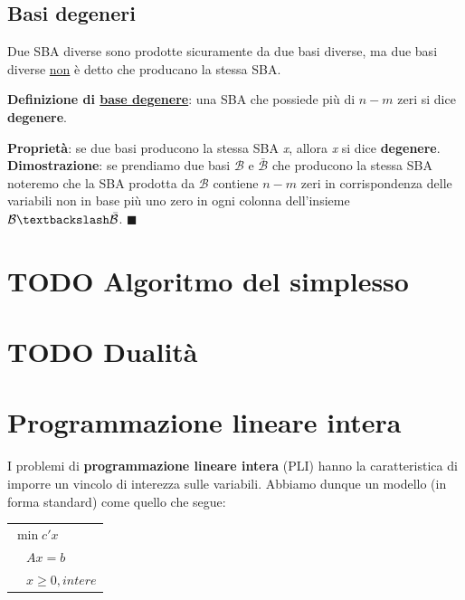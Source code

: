\documentclass[11pt, oneside]{book}
\begin{document}
\section{Basi degeneri}

Due SBA diverse sono prodotte sicuramente da due basi diverse, ma due
basi diverse \underline{non} \`e detto che producano la stessa SBA.

\par\bigskip

{\bf Definizione di \underline{base degenere}}: una SBA che possiede
pi\`u di $n-m$ zeri si dice {\bf degenere}.

\par\bigskip

{\bf Propriet\`a}: se due basi producono la stessa SBA {\em x}, allora
{\em x} si dice {\bf degenere}.\\ {\bf Dimostrazione}: se prendiamo
due basi $\mathcal{B}$ e $\bar{\mathcal{B}}$ che producono la stessa
SBA noteremo che la SBA prodotta da $\mathcal{B}$ contiene $n-m$ zeri
in corrispondenza delle variabili non in base pi\`u uno zero in ogni
colonna dell'insieme
$\mathcal{B}\textbackslash\bar{\mathcal{B}}$. $\blacksquare$

\chapter{TODO Algoritmo del simplesso}
\chapter{TODO Dualit\`a}


\chapter{Programmazione lineare intera}

I problemi di {\bf programmazione lineare intera} (PLI) hanno la
caratteristica di imporre un vincolo di interezza sulle
variabili. Abbiamo dunque un modello (in forma standard) come quello
che segue:

\begin{center}
  
  \begin{tabular}{l}
    $\min c'x$ \\
    $\quad Ax = b$ \\
    $\quad x \geq 0, intere$
  \end{tabular}

\end{center}
\end{document}
